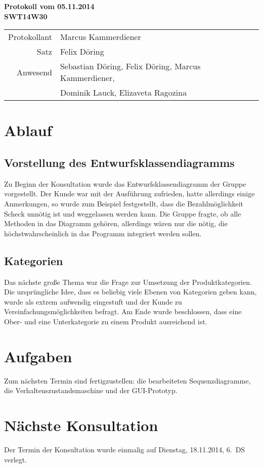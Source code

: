 \documentclass{scrartcl}
\begin{document}
\begin{center}
\LARGE \bf{Protokoll vom 05.11.2014 \\
SWT14W30}
\end{center}

\begin{tabular}{rp{10cm}}
Protokollant & Marcus Kammerdiener \\
Satz & Felix Döring \\
Anwesend & Sebastian Döring, Felix Döring, Marcus Kammerdiener,\\
& Dominik Lauck, Elizaveta Ragozina \\
\end{tabular}

\vspace*{3em}

\section{Ablauf}
\subsection{Vorstellung des Entwurfsklassendiagramms}
Zu Beginn der Konsultation wurde das Entwurfsklassendiagramm der Gruppe vorgestellt. Der Kunde war mit der Ausführung zufrieden, hatte allerdings einige Anmerkungen, so wurde zum Beispiel festgestellt, dass die Bezahlmöglichkeit Scheck unnötig ist und weggelassen werden kann. Die Gruppe fragte, ob alle Methoden in das Diagramm gehören, allerdings wären nur die nötig, die höchstwahrscheinlich in das Programm integriert werden sollen.
\subsection{Kategorien}
Das nächste große Thema war die Frage zur Umsetzung der Produktkategorien. Die ursprüngliche Idee, dass es beliebig viele Ebenen von Kategorien geben kann, wurde als extrem aufwendig eingestuft und der Kunde zu Vereinfachungsmöglichkeiten befragt. Am Ende wurde beschlossen, dass eine Ober- und eine Unterkategorie zu einem Produkt ausreichend ist.
\vspace*{1em}

\section{Aufgaben}
Zum nächsten Termin sind fertigzustellen: die bearbeiteten Sequenzdiagramme, die Verhaltenszustandsmaschine und der GUI-Prototyp.

\section{N\"achste Konsultation}
Der Termin der Konsultation wurde einmalig auf Dienstag, 18.11.2014, 6.~DS verlegt.
\end{document}

